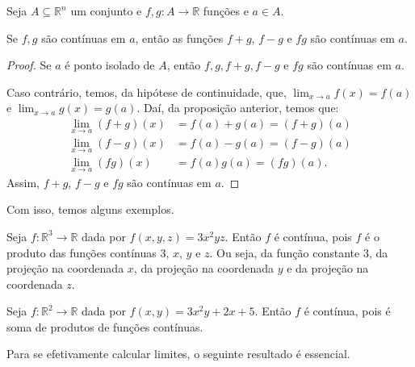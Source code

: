 \begin{corollary}
    Seja $A\subseteq \mathbb R^n$ um conjunto e $f, g: A \to \mathbb R$ funções e $a \in A$.

    Se $f, g$ são contínuas em $a$, então as funções $f+g$, $f-g$ e $fg$ são contínuas em $a$.
\end{corollary}

\begin{proof}
    Se $a$ é ponto isolado de $A$, então $f, g, f+g, f-g$ e $fg$ são contínuas em $a$.

    Caso contrário, temos, da hipótese de continuidade, que, $\lim_{x\to a} f(x) = f(a)$ e $\lim_{x\to a} g(x) = g(a)$.
    Daí, da proposição anterior, temos que:
    \begin{align*}
        \lim_{x\to a} (f+g)(x) &= f(a) + g(a) = (f+g)(a) \\
        \lim_{x\to a} (f-g)(x) &= f(a) - g(a) = (f-g)(a) \\
        \lim_{x\to a} (fg)(x) &= f(a)g(a) = (fg)(a).
    \end{align*}
    Assim, $f+g$, $f-g$ e $fg$ são contínuas em $a$.
\end{proof}

Com isso, temos alguns exemplos.

\begin{example}
    Seja $f:\mathbb R^3\rightarrow \mathbb R$ dada por $f(x, y, z) = 3x^2yz$.
    Então $f$ é contínua, pois $f$ é o produto das funções contínuas $3$, $x$, $y$ e $z$.
    Ou seja, da função constante $3$, da projeção na coordenada $x$, da projeção na coordenada $y$ e da projeção na coordenada $z$.
\end{example}

\begin{example}
    Seja $f:\mathbb R^2\rightarrow \mathbb R$ dada por $f(x, y) = 3x^2y + 2x + 5$.
    Então $f$ é contínua, pois é soma de produtos de funções contínuas.
\end{example}

Para se efetivamente calcular limites, o seguinte resultado é essencial.

